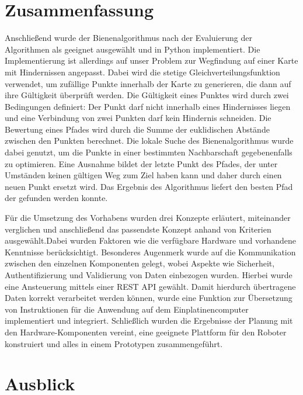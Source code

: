 \section{Zusammenfassung}
Anschließend wurde der Bienenalgorithmus nach der Evaluierung der Algorithmen als geeignet ausgewählt und in Python implementiert. 
Die Implementierung ist allerdings auf unser Problem zur Wegfindung auf einer Karte mit Hindernissen angepasst. Dabei wird die stetige Gleichverteilungsfunktion verwendet, um zufällige Punkte innerhalb der Karte zu generieren, die dann auf ihre Gültigkeit überprüft werden. Die Gültigkeit eines Punktes wird durch zwei Bedingungen definiert: Der Punkt darf nicht innerhalb eines Hindernisses liegen und eine Verbindung von zwei Punkten darf kein Hindernis schneiden. Die Bewertung eines Pfades wird durch die Summe der euklidischen Abstände zwischen den Punkten berechnet. Die lokale Suche des Bienenalgorithmus wurde dabei genutzt, um die Punkte in einer bestimmten Nachbarschaft gegebenenfalls zu optimieren. Eine Ausnahme bildet der letzte Punkt des Pfades, der unter Umständen keinen gültigen Weg zum Ziel haben kann und daher durch einen neuen Punkt ersetzt wird. Das Ergebnis des Algorithmus liefert den besten Pfad der gefunden werden konnte. 

Für die Umsetzung des Vorhabens wurden drei Konzepte erläutert, miteinander verglichen und anschließend das passendste Konzept anhand von Kriterien ausgewählt.Dabei wurden Faktoren wie die verfügbare Hardware und vorhandene Kenntnisse berücksichtigt. Besonderes Augenmerk wurde auf die Kommunikation zwischen den einzelnen Komponenten gelegt, wobei Aspekte wie Sicherheit, Authentifizierung und Validierung von Daten einbezogen wurden. Hierbei wurde eine Ansteuerung mittels einer REST API gewählt. Damit hierdurch übertragene Daten korrekt verarbeitet werden können, wurde eine Funktion zur Übersetzung von Instruktionen für die Anwendung auf dem Einplatinencomputer implementiert und integriert. Schließlich wurden die Ergebnisse der Planung mit den Hardware-Komponenten vereint, eine geeignete Plattform für den Roboter konstruiert und alles in einem Prototypen zusammengeführt.

\section{Ausblick}
